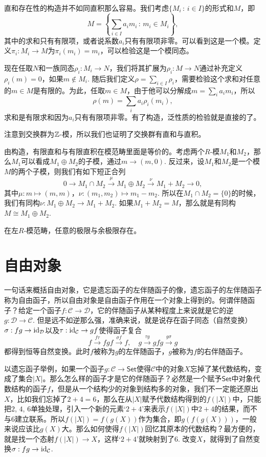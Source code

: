 直和存在性的构造并不如同直积那么容易。我们考虑$\{M_i\,:\, i\in I\}$的形式和$M$，即
\[
	M=\left\{\sum_{i\in I} a_i m_i\,:\, m_i\in M_i\right\},
\]
其中的求和只有有限项，或者说系数$a_i$只有有限项非零。可以看到这是一个模。定义$\pi_i:M_i\to M$为$\pi_i(m_i)=m_i$，可以检验这是一个模同态。

现在任取$N$和一族同态$\rho_i:M_i\to N$，我们将其扩展为$\rho_i:M\to N$通过补充定义$\rho_i(m)=0$，如果$m\notin M_i$. 随后我们定义$\rho = \sum_{i\in I} \rho_i$，需要检验这个求和对任意的$m\in M$是有限的。为此，任取$m\in M$，由于他可以分解成$m=\sum_i a_i m_i$，所以
\[
	\rho(m)=\sum_i a_i \rho_i(m_i),
\]
求和是有限求和因为$a_i$只有有限项非零。有了构造，泛性质的检验就是直接的了。

注意到交换群为$\mathbb{Z}$-模，所以我们也证明了交换群有直和与直积。

\para 由构造，有限直和与有限直积在模范畴里面是等价的。考虑两个$R$-模$M_1$和$M_2$，那么$M_1$可以看成$M_1\oplus M_2$的子模，通过$m\to (m,0)$. 反过来，设$M_1$和$M_2$是一个模$M$的两个子模，则我们有如下短正合列
\[
	0\to M_1\cap M_2 \xrightarrow{\mu} M_1\oplus M_2\xrightarrow{\nu} M_1+M_2\to 0,
\]
其中$\mu:m\mapsto (m,m)$，$\nu:(m_1,m_2)\mapsto m_1-m_2$. 所以在$M_1\cap M_2=\{0\}$的时候，我们有同构$\nu: M_1\oplus M_2\to M_1+M_2$. 如果$M_1+M_2=M$，那么就是有同构$M\cong M_1\oplus M_2$.

\theo 在左$R$-模范畴，任意的极限与余极限存在。 \notprove

\section{自由对象}

一句话来概括自由对象，它是遗忘函子的左伴随函子的像，遗忘函子的左伴随函子称为自由函子，所以自由对象是自由函子作用在一个对象上得到的。何谓伴随函子？给定一个函子$f:\mathcal{C}\to \mathcal{D}$，它的伴随函子从某种程度上来说就是它的逆$g:\mathcal{D}\to \mathcal{C}$. 但是远不如逆那么强，准确来说，就是说存在函子同态（自然变换）$\sigma:fg\to \operatorname{id}_{\mathcal{D}}$以及$\tau:\operatorname{id}_{\mathcal{C}}\to gf$使得函子复合
\[
	f\xrightarrow{f\tau}fgf\xrightarrow{\sigma f}f,\quad g\xrightarrow{\tau g}gfg\xrightarrow{g\sigma}g
\]
都得到恒等自然变换。此时$f$被称为$g$的左伴随函子，$g$被称为$f$的右伴随函子。

以遗忘函子举例，如果一个函子$g:\mathcal{C}\to \mathsf{Set}$使得$\mathcal{C}$中的对象$X$忘掉了某代数结构，变成了集合$|X|$。那么怎么样的函子才是它的伴随函子？必然是一个赋予$\mathsf{Set}$中对象代数结构的函子$f$，但是从一个结构少的对象到结构多的对象，我们不一定能还原出$X$，比如我们忘掉了$2+4=6$，那么在从$|X|$赋予代数结构得到的$f(|X|)$中，只能把$2$, $4$, $6$单独处理，引入一个新的元素`$2+4$'来表示$f(|X|)$中$2+4$的结果，而不与$6$建立联系。所以$f(|X|)=f(g(X))$作为集合，即$g(f(g(X)))$，一般来说应该比$g(X)$大。那么如何使得$f(|X|)$回忆其原本的代数结构？最方便的，就是找一个态射$f(|X|)\to X$，这样`$2+4$'就映射到了$6$. 改变$X$，就得到了自然变换$\sigma:fg\to \operatorname{id}_\mathcal{C}$.

